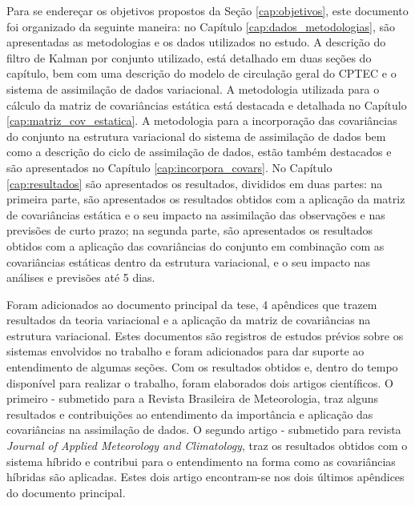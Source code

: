 Para se endereçar os objetivos propostos da Seção \ref{cap:objetivos}, este documento foi organizado da seguinte maneira: no Capítulo \ref{cap:dados_metodologias}, são apresentadas as metodologias e os dados utilizados no estudo. A descrição do filtro de Kalman por conjunto utilizado, está detalhado em duas seções do capítulo, bem com uma descrição do modelo de circulação geral do CPTEC e o sistema de assimilação de dados variacional. A metodologia utilizada para o cálculo da matriz de covariâncias estática está destacada e detalhada no Capítulo \ref{cap:matriz_cov_estatica}. A metodologia para a incorporação das covariâncias do conjunto na estrutura variacional do sistema de assimilação de dados bem como a descrição do ciclo de assimilação de dados, estão também destacados e são apresentados no Capítulo \ref{cap:incorpora_covars}. No Capítulo \ref{cap:resultados} são apresentados os resultados, divididos em duas partes: na primeira parte, são apresentados os resultados obtidos com a aplicação da matriz de covariâncias estática e o seu impacto na assimilação das observações e nas previsões de curto prazo; na segunda parte, são apresentados os resultados obtidos com a aplicação das covariâncias do conjunto em combinação com as covariâncias estáticas dentro da estrutura variacional, e o seu impacto nas análises e previsões até 5 dias.

Foram adicionados ao documento principal da tese, 4 apêndices que trazem resultados da teoria variacional e a aplicação da matriz de covariâncias na estrutura variacional. Estes documentos são registros de estudos prévios sobre os sistemas envolvidos no trabalho e foram adicionados para dar suporte ao entendimento de algumas seções. Com os resultados obtidos e, dentro do tempo disponível para realizar o trabalho, foram elaborados dois artigos científicos. O primeiro - submetido para a Revista Brasileira de Meteorologia, traz alguns resultados e contribuições ao entendimento da importância e aplicação das covariâncias na assimilação de dados. O segundo artigo - submetido para revista \textit{Journal of Applied Meteorology and Climatology}, traz os resultados obtidos com o sistema híbrido e contribui para o entendimento na forma como as covariâncias híbridas são aplicadas. Estes dois artigo encontram-se nos dois últimos apêndices do documento principal.